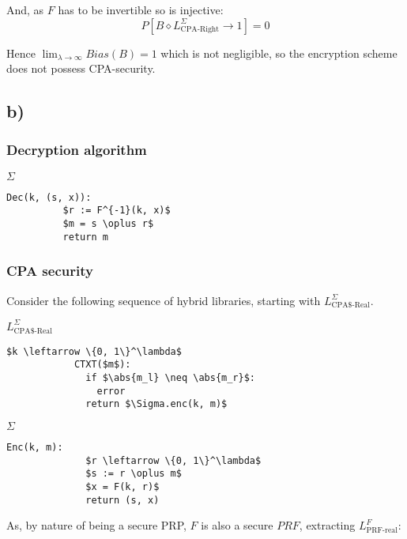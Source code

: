 \documentclass[a4paper]{scrreprt}
\DeclarePairedDelimiter\abs{\lvert}{\rvert}
\begin{document}
And, as $F$ has to be invertible so is injective:
\[
	P[B \diamond L^{\Sigma}_{\text{CPA-Right}} \rightarrow 1] = 0
\]

Hence $\lim_{\lambda \to \infty} Bias(B) = 1$ which is not negligible,
so the encryption scheme does not possess CPA-security.

\subsection{b)}

\subsubsection{Decryption algorithm}

\begin{library}{$\Sigma$}
	\begin{lstlisting}[mathescape=true,autogobble=true]
		Dec(k, (s, x)):
		  $r := F^{-1}(k, x)$
		  $m = s \oplus r$
		  return m
	\end{lstlisting}
\end{library}

\subsubsection{CPA security}

Consider the following sequence of hybrid libraries, starting with
$L^{\Sigma}_{\text{CPA\$-Real}}$.

\begin{tcbraster}[raster columns=2,raster equal height,nobeforeafter,raster column skip=2cm]
	\begin{library}{$L^{\Sigma}_{\text{CPA\$-Real}}$}
		\begin{lstlisting}[mathescape=true,autogobble=true]
			$k \leftarrow \{0, 1\}^\lambda$
			CTXT($m$):
			  if $\abs{m_l} \neq \abs{m_r}$:
			    error
			  return $\Sigma.enc(k, m)$
		\end{lstlisting}
	\end{library}
	\begin{library}{$\Sigma$}
		\begin{lstlisting}[mathescape=true,autogobble=true]
			Enc(k, m):
			  $r \leftarrow \{0, 1\}^\lambda$
			  $s := r \oplus m$
			  $x = F(k, r)$
			  return (s, x)
		\end{lstlisting}
	\end{library}
\end{tcbraster}

As, by nature of being a secure PRP, $F$ is also a secure $PRF$, extracting
$L^{F}_{\text{PRF-real}}$:
\end{document}
